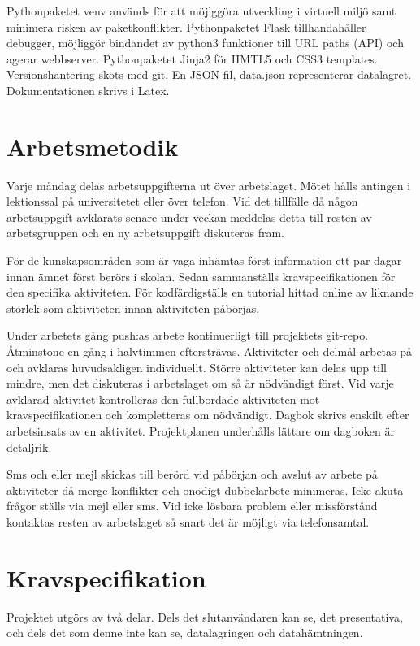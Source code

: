 \documentclass{TDP003mall}
\begin{document}
Pythonpaketet venv används för att möjlggöra utveckling i virtuell miljö samt minimera risken av paketkonflikter.
Pythonpaketet Flask tillhandahåller debugger, möjliggör bindandet av python3 funktioner till URL paths (API) och agerar webbserver.
Pythonpaketet Jinja2 för HMTL5 och CSS3 templates.
Versionshantering sköts med git.
En JSON fil, data.json representerar datalagret.
Dokumentationen skrivs i Latex.

\newpage

\section{Arbetsmetodik}
Varje måndag delas arbetsuppgifterna ut över arbetslaget. Mötet hålls antingen i lektionssal på universitetet eller över telefon. Vid det tillfälle då någon arbetsuppgift avklarats senare under veckan meddelas detta till resten av arbetsgruppen och en ny arbetsuppgift diskuteras fram.

För de kunskapsområden som är vaga inhämtas först information ett par dagar innan ämnet först berörs i skolan. Sedan sammanställs kravspecifikationen för den specifika aktiviteten. För kodfärdigställs en tutorial hittad online av liknande storlek som aktiviteten innan aktiviteten påbörjas.

Under arbetets gång push:as arbete kontinuerligt till projektets git-repo. Åtminstone en gång i halvtimmen eftersträvas. Aktiviteter och delmål arbetas på och avklaras huvudsakligen individuellt. Större aktiviteter kan delas upp till mindre, men det diskuteras i arbetslaget om så är nödvändigt först. Vid varje avklarad aktivitet kontrolleras den fullbordade aktiviteten mot kravspecifikationen och kompletteras om nödvändigt. Dagbok skrivs enskilt efter arbetsinsats av en aktivitet. Projektplanen underhålls lättare om dagboken är detaljrik.

Sms och eller mejl skickas till berörd vid påbörjan och avslut av arbete på aktiviteter då merge konflikter och onödigt dubbelarbete minimeras. Icke-akuta frågor ställs via mejl eller sms. Vid icke lösbara problem eller missförstånd kontaktas resten av arbetslaget så snart det är möjligt via telefonsamtal.

\section{Kravspecifikation}
Projektet utgörs av två delar. Dels det slutanvändaren kan se, det presentativa,
och dels det som denne inte kan se, datalagringen och datahämtningen.
\end{document}
